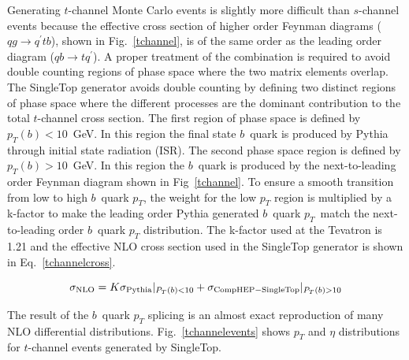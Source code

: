 Generating $t$-channel Monte Carlo events is slightly more difficult than $s$-channel events because the effective cross section of higher order Feynman diagrams ($qg\rightarrow q^{'}tb$), shown in Fig.~\ref{tchannel}, is of the same order as the leading order diagram ($qb\rightarrow tq^{'}$). A proper treatment of the combination is required to avoid double counting regions of phase space where the two matrix elements overlap. The SingleTop generator avoids double counting by defining two distinct regions of phase space where the different processes are the dominant contribution to the total $t$-channel cross section. The first region of phase space is defined by $p_{T}(b)<10$~GeV. In this region the final state $b$~quark is produced by Pythia through initial state radiation (ISR). The second phase space region is defined by $p_{T}(b)>10$~GeV. In this region the $b$~quark is produced by the next-to-leading order Feynman diagram shown in Fig~\ref{tchannel}. To ensure a smooth transition from low to high $b$~quark $p_{T}$, the weight for the low $p_{T}$ region is multiplied by a k-factor to make the leading order Pythia generated $b$~quark $p_{T}$~match the next-to-leading order $b$~quark $p_{T}$ distribution. The k-factor used at the Tevatron is 1.21 and the effective NLO cross section used in the SingleTop generator is shown in Eq.~\ref{tchannelcross}.

\begin{equation}
\label{tchannelcross}
\sigma_{\rm{NLO}} = K\sigma_{\rm{Pythia}}|_{P_{T}(b)<10} + \sigma_{\rm{CompHEP-SingleTop}}|_{P_{T}(b)>10}
\end{equation}

The result of the $b$~quark $p_{T}$ splicing is an almost exact reproduction of many NLO differential distributions. Fig.~\ref{tchannelevents} shows $p_{T}$ and $\eta$ distributions for $t$-channel events generated by SingleTop.

